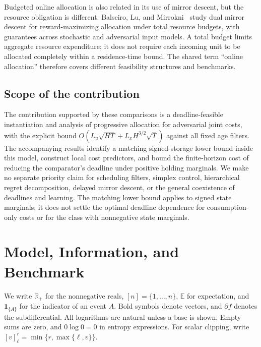 \documentclass[11pt]{article}
\newcommand{\E}{\mathbb{E}}
\newcommand{\Real}{\mathbb{R}}
\newcommand{\ind}[1]{\mathbf{1}_{\{#1\}}}
\theoremstyle{plain}
\theoremstyle{remark}
\numberwithin{equation}{section}
\begin{document}
Budgeted online allocation is also related in its use of mirror
descent, but the resource obligation is different. Balseiro, Lu, and
Mirrokni~\cite{balseiro2023allocation} study dual mirror descent for
reward-maximizing allocation under total resource budgets, with
guarantees across stochastic and adversarial input models. A total
budget limits aggregate resource expenditure; it does not require each
incoming unit to be allocated completely within a residence-time bound.
The shared term ``online allocation'' therefore covers different
feasibility structures and benchmarks.

\subsection{Scope of the contribution}

The contribution supported by these comparisons is a deadline-feasible
instantiation and analysis of progressive allocation for adversarial
joint costs, with the explicit bound
$O(L_u\sqrt{HT}+L_xH^{3/2}\sqrt T)$ against all fixed age filters.
The accompanying results identify a matching signed-storage lower bound
inside this model, construct local cost predictors, and bound the
finite-horizon cost of reducing the comparator's deadline under positive
holding marginals. We make no separate priority claim for scheduling
filters, simplex control, hierarchical regret decomposition, delayed
mirror descent, or the general coexistence of deadlines and learning.
The matching lower bound applies to signed state marginals; it does not
settle the optimal deadline dependence for consumption-only costs or for
the class with nonnegative state marginals.

\section{Model, Information, and Benchmark}
\label{ch6:sec:model}

We write $\Real_+$ for the nonnegative reals, $[n]=\{1,\ldots,n\}$,
$\E$ for expectation, and $\ind{A}$ for the indicator of an event $A$.
Bold symbols denote vectors, and $\partial f$ denotes the subdifferential.
All logarithms are natural unless a base is shown. Empty sums are zero,
and $0\log0=0$ in entropy expressions. For scalar clipping, write
$[v]_\ell^r=\min\{r,\max\{\ell,v\}\}$.
\end{document}
